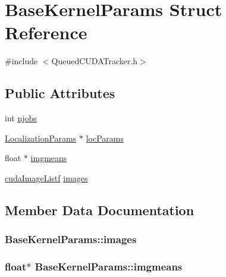 \hypertarget{struct_base_kernel_params}{}\section{Base\+Kernel\+Params Struct Reference}
\label{struct_base_kernel_params}


{\ttfamily \#include $<$Queued\+C\+U\+D\+A\+Tracker.\+h$>$}

\subsection*{Public Attributes}
\begin{DoxyCompactItemize}
\item 
int \hyperlink{struct_base_kernel_params_aec40d44810d0e0a6640c66038af1fbf2}{njobs}
\item 
\hyperlink{struct_localization_params}{Localization\+Params} $\ast$ \hyperlink{struct_base_kernel_params_a199494e0d0548c8b69ee23350e6ece95}{loc\+Params}
\item 
float $\ast$ \hyperlink{struct_base_kernel_params_aa0c58be6d25ab55207ca83bb0047f4d9}{imgmeans}
\item 
\hyperlink{_queued_c_u_d_a_tracker_8h_a84de79f5d4b6e4c8d5622fe712c1bd69}{cuda\+Image\+Listf} \hyperlink{struct_base_kernel_params_abdd6b8722cb871a13069ba0e3cd3ab0b}{images}
\end{DoxyCompactItemize}


\subsection{Member Data Documentation}
\subsubsection[{\texorpdfstring{images}{images}}]{ Base\+Kernel\+Params\+::images}\hypertarget{struct_base_kernel_params_abdd6b8722cb871a13069ba0e3cd3ab0b}{}\label{struct_base_kernel_params_abdd6b8722cb871a13069ba0e3cd3ab0b}
\subsubsection[{\texorpdfstring{imgmeans}{imgmeans}}]{\setlength{\rightskip}{0pt plus 5cm}float$\ast$ Base\+Kernel\+Params\+::imgmeans}\hypertarget{struct_base_kernel_params_aa0c58be6d25ab55207ca83bb0047f4d9}{}\label{struct_base_kernel_params_aa0c58be6d25ab55207ca83bb0047f4d9}
